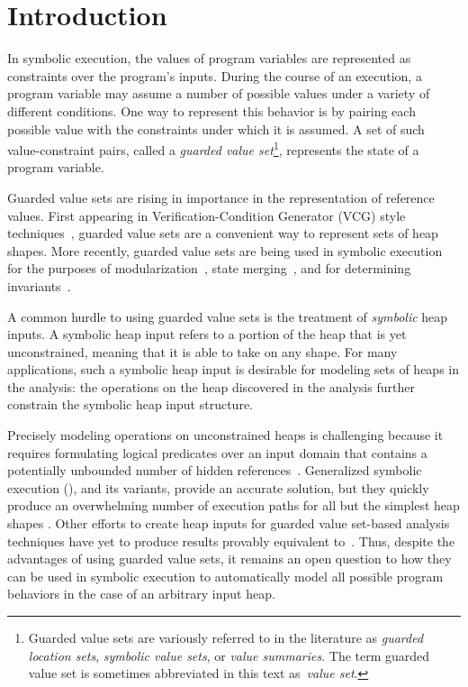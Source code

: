 \section{Introduction}

In symbolic execution, the values of program variables are represented
as constraints over the program's inputs. During the course of an
execution, a program variable may assume a number of possible values
under a variety of different conditions. One way to represent this
behavior is by pairing each possible value with the constraints under
which it is assumed. A set of such value-constraint pairs, called a
\emph{guarded value set}\footnote{Guarded value sets are variously
  referred to in the literature as \emph{guarded location sets},
  \emph{symbolic value sets}, or \emph{value summaries}. The term
  guarded value set is sometimes abbreviated in this text
  as~\emph{value set}.}, represents the state of a program variable.

Guarded value sets are rising in importance in the representation of
reference values. First appearing in Verification-Condition Generator
(VCG) style techniques~\cite{Xie:2005,Dillig:2011}, guarded value sets
are a convenient way to represent sets of heap shapes. More recently,
guarded value sets are being used in symbolic execution for the
purposes of modularization~\cite{Yorsh:2008}, state
merging~\cite{Sen:2014}, and for determining
invariants~\cite{Ferrara:2014,Torlak:2014}.

A common hurdle to using guarded value sets is the treatment of
\emph{symbolic} heap inputs. A symbolic heap input refers to a portion of the heap that is yet unconstrained, meaning that it is able to take on any shape. For many applications, such a symbolic heap input is desirable for modeling sets of heaps in the analysis: the operations on the heap discovered in the analysis further constrain the symbolic heap input
structure.

Precisely modeling operations on unconstrained heaps
is challenging because it requires formulating logical predicates over
an input domain that contains a potentially unbounded number of hidden
references~\cite{Chen:2013,Qu:2011}. Generalized symbolic execution
(\gsetxt{}), and its variants, provide an accurate
solution, but they quickly produce an overwhelming number of execution
paths for all but the simplest heap shapes \cite{GSE03,Deng:2007}. Other efforts to 
create heap inputs for guarded value set-based analysis 
techniques \cite{Dillig:2011,Xie:2005} have yet to
produce results provably equivalent to~\gsetxt{}. Thus, despite
the advantages of using guarded value sets, it remains an open
question to how they can be used in symbolic execution to automatically
model all possible program behaviors in the case of an arbitrary input
heap.

